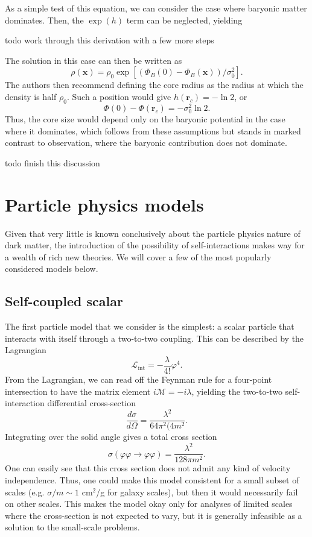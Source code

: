 As a simple test of this equation, we can consider the case where
baryonic matter dominates. Then, the \(\exp(h)\) term can be neglected,
yielding

todo work through this derivation with a few more steps

The solution in this case can then be written as
\[ \rho(\mathbf{x}) = \rho_0 \exp[(\Phi_B(0) - \Phi_B(\mathbf{x}))/\sigma_0^2]. \]
The authors then recommend defining the core radius as the radius at
which the density is half \(\rho_0\). Such a position would give
\(h(\mathbf{r}_c) = -\ln 2\), or
\[ \Phi(0) - \Phi(\mathbf{r}_c) = -\sigma_0^2 \ln 2. \] Thus, the core
size would depend only on the baryonic potential in the case where it
dominates, which follows from these assumptions but stands in marked
contrast to observation, where the baryonic contribution does not
dominate.

todo finish this discussion

\hypertarget{particle-physics-models}{%
\section{Particle physics models}\label{particle-physics-models}}

Given that very little is known conclusively about the particle physics
nature of dark matter, the introduction of the possibility of
self-interactions makes way for a wealth of rich new theories. We will
cover a few of the most popularly considered models below.

\hypertarget{self-coupled-scalar}{%
\subsection{Self-coupled scalar}\label{self-coupled-scalar}}

The first particle model that we consider is the simplest: a scalar
particle that interacts with itself through a two-to-two coupling. This
can be described by the Lagrangian
\[ \mathcal{L}_{\text{int}} = -\frac{\lambda}{4!} \varphi^4. \] From the
Lagrangian, we can read off the Feynman rule for a four-point
intersection to have the matrix element \(i\mathcal{M} = -i\lambda\),
yielding the two-to-two self-interaction differential cross-section
\[ \frac{d\sigma}{d\Omega} = \frac{\lambda^2}{64\pi^2 (4m^2}. \]
Integrating over the solid angle gives a total cross section
\[ \sigma(\varphi\varphi\to\varphi\varphi) = \frac{\lambda^2}{128\pi m^2}. \]
One can easily see that this cross section does not admit any kind of
velocity independence. Thus, one could make this model consistent for a
small subset of scales (e.g. \(\sigma/m \sim 1\) cm\(^2\)/g for galaxy
scales), but then it would necessarily fail on other scales. This makes
the model okay only for analyses of limited scales where the
cross-section is not expected to vary, but it is generally infeasible as
a solution to the small-scale problems.

